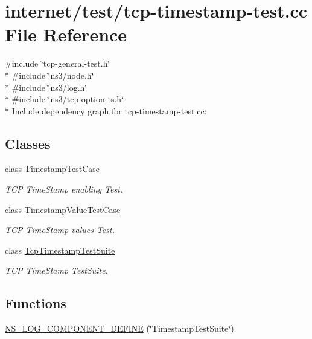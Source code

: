 \hypertarget{tcp-timestamp-test_8cc}{}\section{internet/test/tcp-\/timestamp-\/test.cc File Reference}
\label{tcp-timestamp-test_8cc}
{\ttfamily \#include \char`\"{}tcp-\/general-\/test.\+h\char`\"{}}\\*
{\ttfamily \#include \char`\"{}ns3/node.\+h\char`\"{}}\\*
{\ttfamily \#include \char`\"{}ns3/log.\+h\char`\"{}}\\*
{\ttfamily \#include \char`\"{}ns3/tcp-\/option-\/ts.\+h\char`\"{}}\\*
Include dependency graph for tcp-\/timestamp-\/test.cc\+:
\subsection*{Classes}
\begin{DoxyCompactItemize}
\item 
class \hyperlink{classTimestampTestCase}{Timestamp\+Test\+Case}
\begin{DoxyCompactList}\small\item\em T\+CP Time\+Stamp enabling Test. \end{DoxyCompactList}\item 
class \hyperlink{classTimestampValueTestCase}{Timestamp\+Value\+Test\+Case}
\begin{DoxyCompactList}\small\item\em T\+CP Time\+Stamp values Test. \end{DoxyCompactList}\item 
class \hyperlink{classTcpTimestampTestSuite}{Tcp\+Timestamp\+Test\+Suite}
\begin{DoxyCompactList}\small\item\em T\+CP Time\+Stamp Test\+Suite. \end{DoxyCompactList}\end{DoxyCompactItemize}
\subsection*{Functions}
\begin{DoxyCompactItemize}
\item 
\hyperlink{tcp-timestamp-test_8cc_af8d2349834b54a5c404b291bfc33f0eb}{N\+S\+\_\+\+L\+O\+G\+\_\+\+C\+O\+M\+P\+O\+N\+E\+N\+T\+\_\+\+D\+E\+F\+I\+NE} (\char`\"{}Timestamp\+Test\+Suite\char`\"{})
\end{DoxyCompactItemize}
